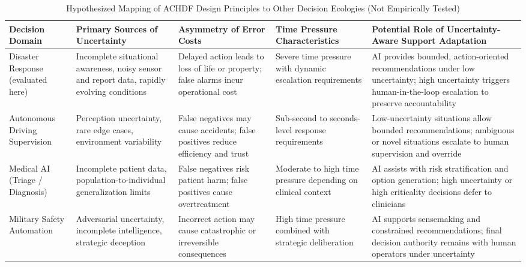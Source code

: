 \documentclass[journal]{IEEEtran}
\theoremstyle{plain}
\theoremstyle{definition}
\providecommand{\DIFaddbegin}{} %
\providecommand{\DIFaddend}{} %
\providecommand{\DIFdelend}{} %
\newcommand{\DIFaddincludegraphics}[2][]{{\color{blue}\fbox{\DIFOincludegraphics[#1]{#2}}}} %
\DeclareRobustCommand{\DIFaddbegin}{\DIFOaddbegin \let\includegraphics\DIFaddincludegraphics} %
\DeclareRobustCommand{\DIFaddend}{\DIFOaddend \let\includegraphics\DIFOincludegraphics} %
\DeclareRobustCommand{\DIFdelend}{\DIFOaddend \let\includegraphics\DIFOincludegraphics} %
\begin{document}
\DIFdelend \DIFaddbegin \begin{table}[t]
\centering
\caption{Hypothesized Mapping of ACHDF Design Principles to Other Decision Ecologies (Not Empirically Tested)}
\label{tab:achdf_transferability}
\begin{tabular}{p{3cm} p{3.2cm} p{3.2cm} p{2.8cm} p{3.9cm}}
\hline
\textbf{Decision Domain} &
\textbf{Primary Sources of Uncertainty} &
\textbf{Asymmetry of Error Costs} &
\textbf{Time Pressure Characteristics} &
\textbf{Potential Role of Uncertainty-Aware Support Adaptation} \\
\hline
Disaster Response (evaluated here) &
Incomplete situational awareness, noisy sensor and report data, rapidly evolving conditions &
Delayed action leads to loss of life or property; false alarms incur operational cost &
Severe time pressure with dynamic escalation requirements &
AI provides bounded, action-oriented recommendations under low uncertainty; high uncertainty triggers human-in-the-loop escalation to preserve accountability \\

Autonomous Driving Supervision &
Perception uncertainty, rare edge cases, environment variability &
False negatives may cause accidents; false positives reduce efficiency and trust &
Sub-second to seconds-level response requirements &
Low-uncertainty situations allow bounded recommendations; ambiguous or novel situations escalate to human supervision and override \\

Medical AI (Triage / Diagnosis) &
Incomplete patient data, population-to-individual generalization limits &
False negatives risk patient harm; false positives cause overtreatment &
Moderate to high time pressure depending on clinical context &
AI assists with risk stratification and option generation; high uncertainty or high criticality decisions defer to clinicians \\

Military Safety Automation &
Adversarial uncertainty, incomplete intelligence, strategic deception &
Incorrect action may cause catastrophic or irreversible consequences &
High time pressure combined with strategic deliberation &
AI supports sensemaking and constrained recommendations; final decision authority remains with human operators under uncertainty \\

\hline
\end{tabular}
\end{table}
\DIFaddend 
\end{document}
